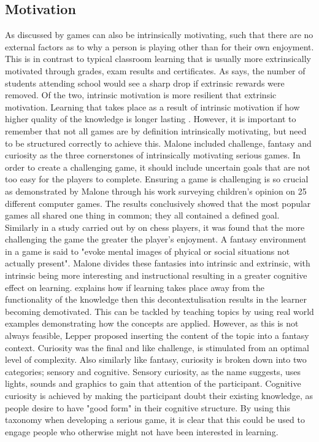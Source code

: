 \documentclass[12pt,a4paper]{report}
\begin{document}
\subsection{Motivation}
As discussed by \cite{malone1981toward} games can also be intrinsically motivating, such that there are no external factors as to why a person is playing other than for their own enjoyment. This is in contrast to typical classroom learning that is usually more extrinsically motivated through grades, exam results and certificates. As  \citep{csikszentmihalyi1997talented} says, the number of students attending school would see a sharp drop if extrinsic rewards were removed. Of the two, intrinsic motivation is more resilient that extrinsic motivation. Learning that takes place as a result of intrinsic motivation if how higher quality of the knowledge is longer lasting \citep{kawachi2003initiating}. However, it is important to remember that not all games are by definition intrinsically motivating, but need to be structured correctly to achieve this. Malone included challenge, fantasy and curiosity as the three cornerstones of intrinsically motivating serious games.  In order to create a challenging game, it should include uncertain goals that are not too easy for the players to complete. Ensuring a game is challenging is so crucial as demonstrated by Malone through his work surveying children's opinion on 25 different computer games. The results conclusively showed that the most popular games all shared one thing in common; they all contained a defined goal.  Similarly in a study carried out by \citep{abuhamdeh2012importance} on chess players, it was found that the more challenging the game the greater the player's enjoyment. A fantasy environment in a game is said to "evoke mental images of phyical or social situations not actually present". Malone divides these fantasies into intrinsic and extrinsic, with intrinsic being more interesting and instructional resulting in a  greater cognitive effect on learning. \citep{lepper1988motivational} explains how if learning takes place away from the functionality of the knowledge then this decontextulisation results in the learner becoming demotivated.  This can be tackled by teaching topics by using real world examples demonstrating how the concepts are applied.  However, as this is not always feasible, Lepper proposed inserting the content of the topic into a fantasy context. Curiosity was the final and like challenge, is stimulated from an optimal level of complexity. Also similarly like fantasy, curiosity is  broken down into two categories; sensory and cognitive.  Sensory curiosity, as the name suggests, uses lights, sounds and graphics to gain that attention of the participant. Cognitive curiosity is achieved by making the participant doubt their existing knowledge, as people desire to have "good form" in their cognitive structure.   By using this taxonomy when developing a serious game, it is clear that this could be used to engage people who otherwise might not have been interested in learning. 
\end{document}
